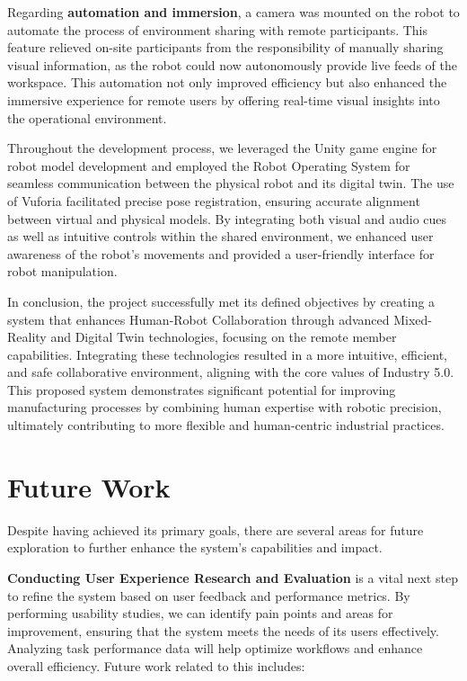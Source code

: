 Regarding \textbf{automation and immersion}, a camera was mounted on the robot to automate the process of environment sharing with remote participants. This feature relieved on-site participants from the responsibility of manually sharing visual information, as the robot could now autonomously provide live feeds of the workspace. This automation not only improved efficiency but also enhanced the immersive experience for remote users by offering real-time visual insights into the operational environment.

Throughout the development process, we leveraged the Unity game engine for robot model development and employed the Robot Operating System for seamless communication between the physical robot and its digital twin. The use of Vuforia facilitated precise pose registration, ensuring accurate alignment between virtual and physical models. By integrating both visual and audio cues as well as intuitive controls within the shared environment, we enhanced user awareness of the robot's movements and provided a user-friendly interface for robot manipulation.

In conclusion, the project successfully met its defined objectives by creating a system that enhances Human-Robot Collaboration through advanced Mixed-Reality and Digital Twin technologies, focusing on the remote member capabilities. Integrating these technologies resulted in a more intuitive, efficient, and safe collaborative environment, aligning with the core values of Industry 5.0. This proposed system demonstrates significant potential for improving manufacturing processes by combining human expertise with robotic precision, ultimately contributing to more flexible and human-centric industrial practices.

\section{Future Work}

Despite having achieved its primary goals, there are several areas for future exploration to further enhance the system's capabilities and impact.

\textbf{Conducting User Experience Research and Evaluation} is a vital next step to refine the system based on user feedback and performance metrics. By performing usability studies, we can identify pain points and areas for improvement, ensuring that the system meets the needs of its users effectively. Analyzing task performance data will help optimize workflows and enhance overall efficiency.
Future work related to this includes:

